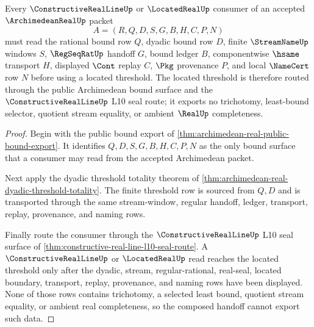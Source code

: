 \begin{theorem}
\label{thm:archimedean-real-located-threshold-handoff}
Every $\ConstructiveRealLineUp$ or $\LocatedRealUp$ consumer of an accepted $\ArchimedeanRealUp$ packet
$$
A=(R,Q,D,S,G,B,H,C,P,N)
$$
must read the rational bound row $Q$, dyadic bound row $D$, finite $\StreamNameUp$ windows $S$, $\RegSeqRatUp$ handoff $G$, bound ledger $B$, componentwise $\hsame$ transport $H$, displayed $\Cont$ replay $C$, $\Pkg$ provenance $P$, and local $\NameCert$ row $N$ before using a located threshold. The located threshold is therefore routed through the public Archimedean bound surface and the $\ConstructiveRealLineUp$ L10 seal route; it exports no trichotomy, least-bound selector, quotient stream equality, or ambient $\RealUp$ completeness.
\end{theorem}
\begin{proof}
Begin with the public bound export of \autoref{thm:archimedean-real-public-bound-export}. It identifies $Q,D,S,G,B,H,C,P,N$ as the only bound surface that a consumer may read from the accepted Archimedean packet.

Next apply the dyadic threshold totality theorem of \autoref{thm:archimedean-real-dyadic-threshold-totality}. The finite threshold row is sourced from $Q,D$ and is transported through the same stream-window, regular handoff, ledger, transport, replay, provenance, and naming rows.

Finally route the consumer through the $\ConstructiveRealLineUp$ L10 seal surface of \autoref{thm:constructive-real-line-l10-seal-route}. A $\ConstructiveRealLineUp$ or $\LocatedRealUp$ read reaches the located threshold only after the dyadic, stream, regular-rational, real-seal, located boundary, transport, replay, provenance, and naming rows have been displayed. None of those rows contains trichotomy, a selected least bound, quotient stream equality, or ambient real completeness, so the composed handoff cannot export such data.
\end{proof}

